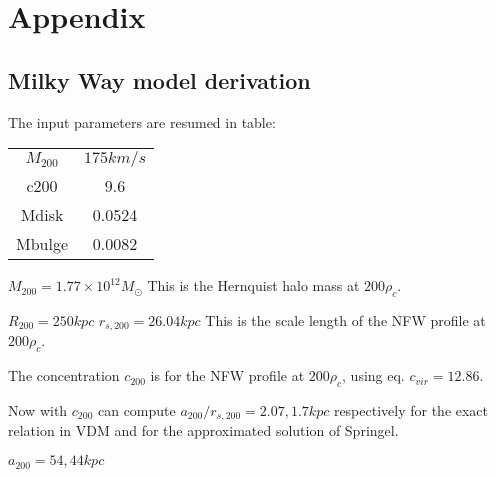 \section{Appendix}\label{sec:Appendix}

\subsection{Milky Way model derivation}

The input parameters are resumed in table:

\begin{table}
\begin{center}
\begin{tabular}{c c}
$M_{200}$ & $175 km/s$ \\
c200 & 9.6 \\
Mdisk & 0.0524 \\
Mbulge & 0.0082 \\
\end{tabular}
\end{center}
\end{table}

$M_{200} = 1.77 \times 10^{12}M_{\odot}$ This is the Hernquist halo
mass at $200\rho_c$.

$R_{200} = 250 kpc$
$r_{s, 200} = 26.04 kpc$ This is the scale length of the NFW profile
at $200\rho_c$.

The concentration $c_{200}$ is for the NFW profile at $200\rho_c$,
using eq. $c_{vir}=12.86$.

Now with $c_{200}$ can compute $a_{200}/r_{s,200} = 2.07, 1.7 kpc$
respectively for the exact relation in VDM and for the approximated
solution of Springel.

$a_{200} = 54, 44 kpc$





